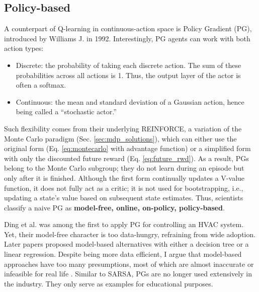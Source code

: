 \documentclass[../main.tex]{subfiles}
\begin{document}
\subsection{Policy-based}
A counterpart of Q-learning in continuous-action space is Policy Gradient (PG), introduced by Williams J. \cite{williams1992pg} in 1992. Interestingly, PG agents can work with both action types:
\begin{itemize}
    \item Discrete: the probability of taking each discrete action. The sum of these probabilities across all actions is 1. Thus, the output layer of the actor is often a softmax.
    \item Continuous: the mean and standard deviation of a Gaussian action, hence being called a “stochastic actor.”
\end{itemize}
Such flexibility comes from their underlying REINFORCE, a variation of the Monte Carlo paradigm (Sec. \ref{sec:mdp_solutions}), which can either use the original form (Eq. \ref{eq:montecarlo} with advantage function) or a simplified form with only the discounted future reward (Eq. \ref{eq:future_rwd}). As a result, PGs belong to the Monte Carlo subgroup; they do not learn during an episode but only after it is finished. Although the first form continually updates a V-value function, it does not fully act as a critic; it is not used for bootstrapping, i.e., updating a state's value based on subsequent state estimates. Thus, scientists classify a naive PG as \textbf{model-free, online, on-policy, policy-based}.

Ding et al. \cite{ding2019octopus} was among the first to apply PG for controlling an HVAC system. Yet, their model-free character is too data-hungry, refraining from wide adoption. Later papers proposed model-based alternatives \cite{ding2020mb2c, chen2019gnu, an2024beyondblackboxpolicies} with either a decision tree or a linear regression. Despite being more data efficient, I argue that model-based approaches have too many presumptions, most of which are almost inaccurate or infeasible for real life \cite{gu2016deep, bairblog_modelbasedrl}. Similar to SARSA, PGs are no longer used extensively in the industry. They only serve as examples for educational purposes.
\end{document}
